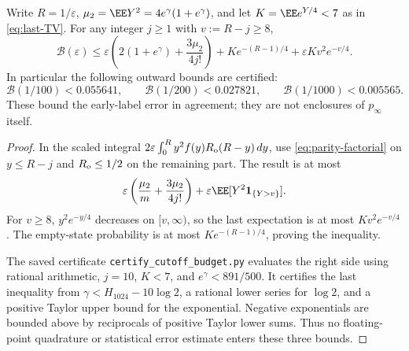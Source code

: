 \documentclass[11pt,letterpaper]{article}
\newcommand{\ind}{\mathbf 1}\newcommand{\Exp}{\operatorname{Exp}}
\begin{document}
\begin{proposition}
\label{prop:certified-cutoff}
Write $R=1/\varepsilon$, $\mu_2=\EE Y^2=4e^\gamma(1+e^\gamma)$,
and let $K=\EE e^{Y/4}<7$ as in \eqref{eq:last-TV}.
For any integer $j\ge1$ with $v:=R-j\ge8$,
\begin{equation}\label{eq:finite-cutoff-budget}
 \mathcal B(\varepsilon)\le
 \varepsilon\left(2(1+e^\gamma)+\frac{3\mu_2}{4j!}\right)
 +K e^{-(R-1)/4}+\varepsilon K v^2e^{-v/4}.
\end{equation}
In particular the following outward bounds are certified:
\[
 \mathcal B(1/100)<0.055641,\qquad
 \mathcal B(1/200)<0.027821,\qquad
 \mathcal B(1/1000)<0.005565.
\]
These bound the early-label error in agreement; they are not enclosures
of $p_\infty$ itself.
\end{proposition}
\begin{proof}
In the scaled integral
$2\varepsilon\int_0^R y^2f(y)R_{\rm o}(R-y)\,dy$, use
\eqref{eq:parity-factorial} on $y\le R-j$ and
$R_{\rm o}\le1/2$ on the remaining part. The result is at most
\[
 \varepsilon\left(\frac{\mu_2}{m}+\frac{3\mu_2}{4j!}\right)
       +\varepsilon\EE[Y^2\ind_{\{Y>v\}}].
\]
For $v\ge8$, $y^2e^{-y/4}$ decreases on $[v,\infty)$, so the last
expectation is at most $Kv^2e^{-v/4}$. The empty-state probability
is at most $Ke^{-(R-1)/4}$, proving the inequality.

The saved certificate \texttt{certify\_cutoff\_budget.py} evaluates
the right side using rational arithmetic, $j=10$, $K<7$, and
$e^\gamma<891/500$. It certifies the last inequality from
$\gamma<H_{1024}-10\log2$, a rational lower series for $\log2$,
and a positive Taylor upper bound for the exponential. Negative
exponentials are bounded above by reciprocals of positive Taylor lower
sums. Thus no floating-point quadrature or statistical error estimate
enters these three bounds.
\end{proof}
\end{document}
